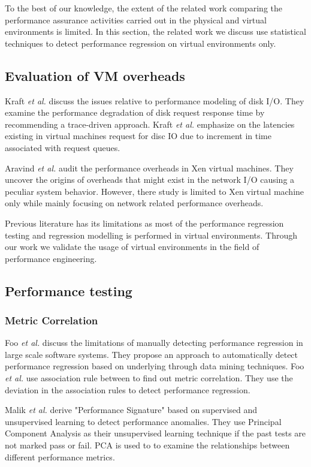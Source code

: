 To the best of our knowledge, the extent of the related work comparing the performance assurance activities carried out in the physical and virtual environments is limited. In this section, the related work we discuss use statistical techniques to detect performance regression on virtual environments only. 

\subsection{Evaluation of VM overheads}

Kraft \textit{et al.} \cite{kraft2011io} discuss the issues relative to performance modeling of disk I/O. They examine the performance degradation of disk request response time by recommending a trace-driven approach. Kraft \textit{et al.} \cite{kraft2011io} emphasize on the latencies existing in virtual machines request for disc IO due to increment in time associated with request queues. 

Aravind \textit{et al.} \cite{menon2005diagnosing} audit the performance overheads in Xen virtual machines. They uncover the origins of overheads that might exist in the network I/O causing a peculiar system behavior. However, there study is limited to Xen virtual machine only while mainly focusing on network related performance overheads.


Previous literature has its limitations as most of the performance regression testing and regression modelling  is performed in virtual environments. Through our work we validate the usage of virtual environments in the field of performance engineering. 
\subsection{Performance testing} 
\subsubsection{Metric Correlation}
Foo\textit{ et al.}\cite{foo2010mining} discuss the limitations of manually detecting performance regression in large scale software systems. They propose an approach to automatically detect performance regression based on underlying through data mining techniques. Foo\textit{ et al.} use association rule between to find out metric correlation. They use the deviation in the association rules to detect performance regression.

Malik\textit{ et al.}\cite{haroon} derive "Performance Signature" based on supervised and unsupervised learning to detect performance anomalies. They use Principal Component Analysis as their unsupervised learning technique if the past tests are not marked pass or fail. PCA is used to to examine the relationships between different performance metrics.

